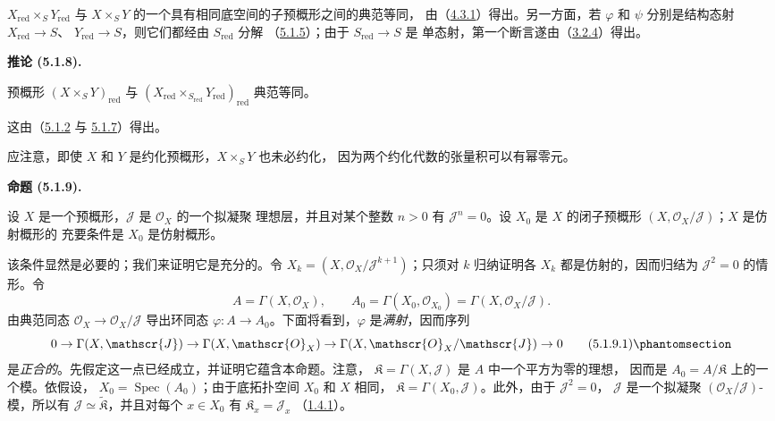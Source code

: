 \documentclass[UTF8,fontset=none,11pt,oneside,openany]{ctexbook}
\newenvironment{proposition}[1][]{%
  \par\medskip\noindent\textbf{命题 (#1).}\ %
}{\par}
\newenvironment{corollary}[1][]{%
  \par\medskip\noindent\textbf{推论 (#1).}\ %
}{\par}
\newcommand{\oldpage}[2][]{%
  \hypertarget{ega-source-page-#1-#2}{}%
  \marginnote{\scriptsize\textbf{#1}~|~#2}\ignorespaces}
\let\EGAOriginalLabel\label
\renewcommand{\label}[1]{\phantomsection\EGAOriginalLabel{#1}}
\begin{document}
$X_{\mathrm{red}}\times_S Y_{\mathrm{red}}$ 与
$X\times_S Y$ 的一个具有相同底空间的子预概形之间的典范等同，
由（\hyperref[I.4.3.1-fr]{4.3.1}）得出。另一方面，若 $\varphi$ 和
$\psi$ 分别是结构态射 $X_{\mathrm{red}}\to S$、
$Y_{\mathrm{red}}\to S$，则它们都经由 $S_{\mathrm{red}}$ 分解
（\hyperref[I.5.1.5-fr]{5.1.5}）；由于 $S_{\mathrm{red}}\to S$ 是
单态射，第一个断言遂由（\hyperref[I.3.2.4-fr]{3.2.4}）得出。

\begin{corollary}[5.1.8]
\label{I.5.1.8-fr}
预概形 $(X\times_S Y)_{\mathrm{red}}$ 与
$(X_{\mathrm{red}}\times_{S_{\mathrm{red}}}Y_{\mathrm{red}})_{\mathrm{red}}$
典范等同。
\end{corollary}

这由（\hyperref[I.5.1.2-fr]{5.1.2} 与
\hyperref[I.5.1.7-fr]{5.1.7}）得出。

应注意，即使 $X$ 和 $Y$ 是约化预概形，$X\times_S Y$ 也未必约化，
因为两个约化代数的张量积可以有幂零元。

\begin{proposition}[5.1.9]
\label{I.5.1.9-fr}
\oldpage[I]{130}
设 $X$ 是一个预概形，$\mathscr{J}$ 是 $\mathscr{O}_X$ 的一个拟凝聚
理想层，并且对某个整数 $n>0$ 有 $\mathscr{J}^n=0$。设 $X_0$ 是
$X$ 的闭子预概形 $(X,\mathscr{O}_X/\mathscr{J})$；$X$ 是仿射概形的
充要条件是 $X_0$ 是仿射概形。
\end{proposition}

该条件显然是必要的；我们来证明它是充分的。令
$X_k=(X,\mathscr{O}_X/\mathscr{J}^{k+1})$；只须对 $k$ 归纳证明各
$X_k$ 都是仿射的，因而归结为 $\mathscr{J}^2=0$ 的情形。令
\[
  A=\Gamma(X,\mathscr{O}_X),\qquad
  A_0=\Gamma(X_0,\mathscr{O}_{X_0})
      =\Gamma(X,\mathscr{O}_X/\mathscr{J}).
\]
由典范同态 $\mathscr{O}_X\to\mathscr{O}_X/\mathscr{J}$ 导出环同态
$\varphi:A\to A_0$。下面将看到，$\varphi$ 是\emph{满射}，因而序列
\[
  0\to\Gamma(X,\mathscr{J})\to\Gamma(X,\mathscr{O}_X)
  \to\Gamma(X,\mathscr{O}_X/\mathscr{J})\to 0
  \tag{5.1.9.1}\label{I.5.1.9.1-fr}
\]
是\emph{正合的}。先假定这一点已经成立，并证明它蕴含本命题。注意，
$\mathfrak{K}=\Gamma(X,\mathscr{J})$ 是 $A$ 中一个平方为零的理想，
因而是 $A_0=A/\mathfrak{K}$ 上的一个模。依假设，
$X_0=\operatorname{Spec}(A_0)$；由于底拓扑空间 $X_0$ 和 $X$ 相同，
$\mathfrak{K}=\Gamma(X_0,\mathscr{J})$。此外，由于 $\mathscr{J}^2=0$，
$\mathscr{J}$ 是一个拟凝聚 $(\mathscr{O}_X/\mathscr{J})$-模，所以有
$\mathscr{J}\simeq\widetilde{\mathfrak{K}}$，并且对每个 $x\in X_0$ 有
$\mathfrak{K}_x=\mathscr{J}_x$
（\hyperref[I.1.4.1-fr]{1.4.1}）。
\end{document}
